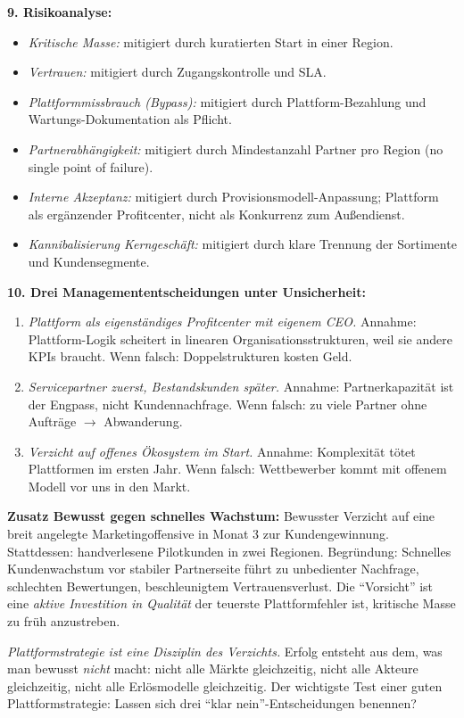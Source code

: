 \documentclass[11pt,a4paper,oneside]{article}
\begin{document}
\begin{loesungbox}
\textbf{9. Risikoanalyse:}
\begin{itemize}
  \item \emph{Kritische Masse:} mitigiert durch kuratierten Start in einer Region.
  \item \emph{Vertrauen:} mitigiert durch Zugangskontrolle und SLA.
  \item \emph{Plattformmissbrauch (Bypass):} mitigiert durch Plattform-Bezahlung und Wartungs-Dokumentation als Pflicht.
  \item \emph{Partnerabhängigkeit:} mitigiert durch Mindestanzahl Partner pro Region (no single point of failure).
  \item \emph{Interne Akzeptanz:} mitigiert durch Provisionsmodell-Anpassung; Plattform als ergänzender Profitcenter, nicht als Konkurrenz zum Außendienst.
  \item \emph{Kannibalisierung Kerngeschäft:} mitigiert durch klare Trennung der Sortimente und Kundensegmente.
\end{itemize}

\textbf{10. Drei Managemententscheidungen unter Unsicherheit:}
\begin{enumerate}
  \item \emph{Plattform als eigenständiges Profitcenter mit eigenem CEO.} Annahme: Plattform-Logik scheitert in linearen Organisationsstrukturen, weil sie andere KPIs braucht. Wenn falsch: Doppelstrukturen kosten Geld.
  \item \emph{Servicepartner zuerst, Bestandskunden später.} Annahme: Partnerkapazität ist der Engpass, nicht Kundennachfrage. Wenn falsch: zu viele Partner ohne Aufträge $\rightarrow$ Abwanderung.
  \item \emph{Verzicht auf offenes Ökosystem im Start.} Annahme: Komplexität tötet Plattformen im ersten Jahr. Wenn falsch: Wettbewerber kommt mit offenem Modell vor uns in den Markt.
\end{enumerate}

\textbf{Zusatz \textendash{} Bewusst gegen schnelles Wachstum:}
Bewusster Verzicht auf eine breit angelegte Marketingoffensive in Monat 3 zur Kundengewinnung. Stattdessen: handverlesene Pilotkunden in zwei Regionen. Begründung: Schnelles Kundenwachstum vor stabiler Partnerseite führt zu unbedienter Nachfrage, schlechten Bewertungen, beschleunigtem Vertrauensverlust. Die ``Vorsicht'' ist eine \emph{aktive Investition in Qualität} \textendash{} der teuerste Plattformfehler ist, kritische Masse zu früh anzustreben.

\begin{merkbox}
\emph{Plattformstrategie ist eine Disziplin des Verzichts.} Erfolg entsteht aus dem, was man bewusst \emph{nicht} macht: nicht alle Märkte gleichzeitig, nicht alle Akteure gleichzeitig, nicht alle Erlösmodelle gleichzeitig. Der wichtigste Test einer guten Plattformstrategie: Lassen sich drei ``klar nein''-Entscheidungen benennen?
\end{merkbox}
\end{loesungbox}
\end{document}
